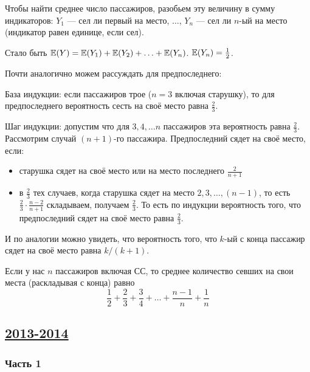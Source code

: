 \begin{enumerate}
\begin{enumerate}
Чтобы найти среднее число пассажиров, разобьем эту величину в сумму индикаторов:
$Y_1$ — сел ли первый на место, $\dots$, $Y_n$ — сел ли $n$-ый на место
(индикатор равен единице, если сел).

Стало быть $\operatorname{\mathbb{E}}(Y)=\operatorname{\mathbb{E}}(Y_1)+\operatorname{\mathbb{E}}(Y_2)+\ldots+\operatorname{\mathbb{E}}(Y_n)$. $\operatorname{\mathbb{E}}(Y_n)=\frac{1}{2}$.

Почти аналогично можем рассуждать для предпоследнего:

База индукции: если пассажиров трое ($n=3$ включая старушку), то для предпоследнего
вероятность сесть на своё место равна $\frac{2}{3}$.

Шаг индукции: допустим что для $3, 4, \ldots n$ пассажиров эта вероятность равна
$\frac{2}{3}$.
Рассмотрим случай $(n+1)$-го пассажира.
Предпоследний сядет на своё место, если:

\renewcommand{\labelitemi}{\textbullet}

\begin{itemize}
\item старушка сядет на своё место или на место последнего $\frac{2}{n+1}$
\item в $\frac{2}{3}$ тех случаев, когда старушка сядет на место $2, 3, \ldots, (n-1)$,
то есть $\frac{2}{3}\cdot \frac{n-2}{n+1}$ складываем, получаем $\frac{2}{3}$.
То есть по индукции вероятность того, что предпоследний сядет на своё место равна
$\frac{2}{3}$.
\end{itemize}
И по аналогии можно увидеть, что вероятность того, что $k$-ый с конца пассажир
сядет на своё место равна $k/(k+1)$.

Если у нас $n$ пассажиров включая СС, то среднее количество севших на свои места
(раскладывая с конца) равно
\[
\frac{1}{2}+\frac{2}{3}+\frac{3}{4}+\dots+\frac{n-1}{n}+\frac{1}{n}
\]
\end{enumerate}
\end{enumerate}



\subsection[2013-2014]{\hyperref[sec:kr_01_ip_2013_2014]{2013-2014}}
\label{sec:sol_kr_01_ip_2013_2014}


\subsubsection*{Часть 1}

